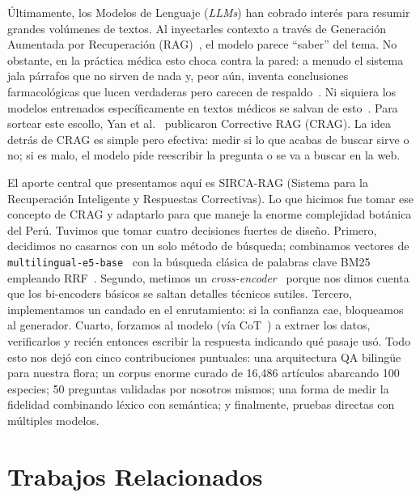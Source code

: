 \documentclass[runningheads]{llncs}
\newcommand{\sirca}{\textsc{SIRCA-RAG}}
\begin{document}
\'{U}ltimamente, los Modelos de Lenguaje (\emph{LLMs}) han cobrado inter\'{e}s para resumir grandes vol\'{u}menes de textos. Al inyectarles contexto a trav\'{e}s de Generaci\'{o}n Aumentada por Recuperaci\'{o}n (RAG)~\cite{lewis2020retrieval}, el modelo parece ``saber'' del tema. No obstante, en la pr\'{a}ctica m\'{e}dica esto choca contra la pared: a menudo el sistema jala p\'{a}rrafos que no sirven de nada y, peor a\'{u}n, inventa conclusiones farmacol\'{o}gicas que lucen verdaderas pero carecen de respaldo~\cite{gao2024retrieval,ji2023survey}. Ni siquiera los modelos entrenados espec\'{i}ficamente en textos m\'{e}dicos se salvan de esto~\cite{lee2020biobert,gu2021domain}. Para sortear este escollo, Yan et al.~\cite{yan2024crag} publicaron Corrective RAG (CRAG). La idea detr\'{a}s de CRAG es simple pero efectiva: medir si lo que acabas de buscar sirve o no; si es malo, el modelo pide reescribir la pregunta o se va a buscar en la web.

El aporte central que presentamos aqu\'{i} es \sirca{} (Sistema para la Recuperaci\'{o}n Inteligente y Respuestas Correctivas). Lo que hicimos fue tomar ese concepto de CRAG y adaptarlo para que maneje la enorme complejidad bot\'{a}nica del Per\'{u}. Tuvimos que tomar cuatro decisiones fuertes de dise\~{n}o. Primero, decidimos no casarnos con un solo m\'{e}todo de b\'{u}squeda; combinamos vectores de \texttt{multilingual-e5-base}~\cite{wang2024e5} con la b\'{u}squeda cl\'{a}sica de palabras clave BM25~\cite{robertson2009bm25} empleando RRF~\cite{cormack2009rrf}. Segundo, metimos un \emph{cross-encoder}~\cite{nogueira2019passage} porque nos dimos cuenta que los bi-encoders b\'{a}sicos se saltan detalles t\'{e}cnicos sutiles. Tercero, implementamos un candado en el enrutamiento: si la confianza cae, bloqueamos al generador. Cuarto, forzamos al modelo (v\'{i}a CoT~\cite{wei2022chain}) a extraer los datos, verificarlos y reci\'{e}n entonces escribir la respuesta indicando qu\'{e} pasaje us\'{o}. Todo esto nos dej\'{o} con cinco contribuciones puntuales: una arquitectura QA biling\"{u}e para nuestra flora; un corpus enorme curado de 16{,}486 art\'{i}culos abarcando 100 especies; 50 preguntas validadas por nosotros mismos; una forma de medir la fidelidad combinando l\'{e}xico con sem\'{a}ntica; y finalmente, pruebas directas con m\'{u}ltiples modelos.

\section{Trabajos Relacionados}
\label{sec:related}
\end{document}
